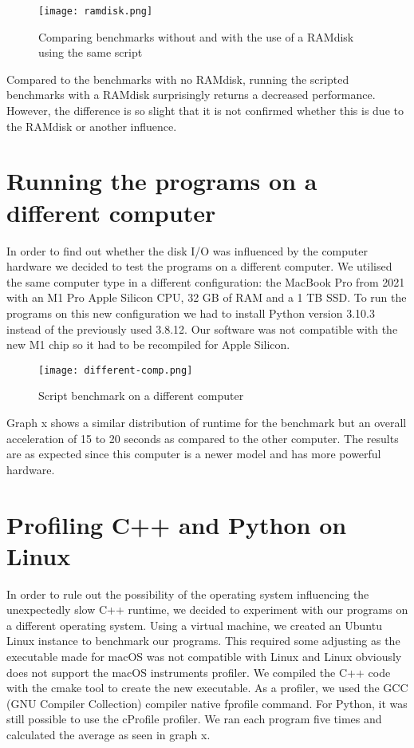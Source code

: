\begin{figure}[H]
	\centering
	\texttt{[image: ramdisk.png]}
	\caption{Comparing benchmarks without and with the use of a RAMdisk using the same script}
	\label{figure:ramdisk}
\end{figure}

Compared to the benchmarks with no RAMdisk, running the scripted benchmarks with a RAMdisk surprisingly returns a decreased performance. However, the difference is so slight that it is not confirmed whether this is due to the RAMdisk or another influence.

\section{Running the programs on a different computer}
In order to find out whether the disk I/O was influenced by the computer hardware we decided to test the programs on a different computer. We utilised the same computer type in a different configuration: the MacBook Pro from 2021 with an M1 Pro Apple Silicon CPU, 32 GB of RAM and a 1 TB SSD. To run the programs on this new configuration we had to install Python version 3.10.3 instead of the previously used 3.8.12. Our software was not compatible with the new M1 chip so it had to be recompiled for Apple Silicon.

\begin{figure}[H]
	\centering
	\texttt{[image: different-comp.png]}
	\caption{Script benchmark on a different computer}
	\label{figure:different-comp}
\end{figure}

Graph x shows a similar distribution of runtime for the benchmark but an overall acceleration of 15 to 20 seconds as compared to the other computer. The results are as expected since this computer is a newer model and has more powerful hardware.

\section{Profiling C++ and Python on Linux}
In order to rule out the possibility of the operating system influencing the unexpectedly slow C++ runtime, we decided to experiment with our programs on a different operating system. Using a virtual machine, we created an Ubuntu Linux instance to benchmark our programs. This required some adjusting as the executable made for macOS was not compatible with Linux and Linux obviously does not support the macOS instruments profiler. We compiled the C++ code with the cmake tool to create the new executable. As a profiler, we used the GCC (GNU Compiler Collection) compiler native fprofile command. For Python, it was still possible to use the cProfile profiler. We ran each program five times and calculated the average as seen in graph x.

